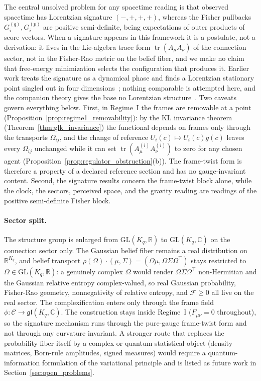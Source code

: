 \documentclass[11pt]{article}
\begin{document}
The central unsolved problem for any spacetime reading is that observed spacetime has Lorentzian signature $(-,+,+,+)$, whereas the Fisher pullbacks $G_i^{(q)}, G_i^{(p)}$ are positive semi-definite, being expectations of outer products of score vectors. When a signature appears in this framework it is a postulate, not a derivation: it lives in the Lie-algebra trace form $\operatorname{tr}(A_\mu A_\nu)$ of the connection sector, not in the Fisher-Rao metric on the belief fiber, and we make no claim that free-energy minimization selects the configuration that produces it. Earlier work treats the signature as a dynamical phase and finds a Lorentzian stationary point singled out in four dimensions~\cite{Greensite1993}; nothing comparable is attempted here, and the companion theory gives the base no Lorentzian structure~\cite[Ch.~1]{DennisGaugeVFE2026}. Two caveats govern everything below. First, in Regime~I the frames are removable at a point (Proposition~\ref{prop:regime1_removability}): by the KL invariance theorem (Theorem~\ref{thm:glk_invariance}) the functional depends on frames only through the transports $\Omega_{ij}$, and the change of reference $U_i(c) \mapsto U_i(c)g(c)$ leaves every $\Omega_{ij}$ unchanged while it can set $\operatorname{tr}(A^{(i)}_\mu A^{(i)}_\nu)$ to zero for any chosen agent (Proposition~\ref{prop:regulator_obstruction}(b)). The frame-twist form is therefore a property of a declared reference section and has no gauge-invariant content. Second, the signature results concern the frame-twist block alone, while the clock, the sectors, perceived space, and the gravity reading are readings of the positive semi-definite Fisher block.

\paragraph{Sector split.} The structure group is enlarged from $\mathrm{GL}(K_q,\mathbb{R})$ to $\mathrm{GL}(K_q,\mathbb{C})$ on the connection sector only. The Gaussian belief fiber remains a real distribution on $\mathbb{R}^{K_q}$, and belief transport $\rho(\Omega)\cdot(\mu,\Sigma) = (\Omega\mu, \Omega\Sigma\Omega^\top)$ stays restricted to $\Omega \in \mathrm{GL}(K_q,\mathbb{R})$: a genuinely complex $\Omega$ would render $\Omega\Sigma\Omega^\top$ non-Hermitian and the Gaussian relative entropy complex-valued, so real Gaussian probability, Fisher-Rao geometry, nonnegativity of relative entropy, and $\mathcal{F} \ge 0$ all live on the real sector. The complexification enters only through the frame field $\phi: \mathcal{C} \to \mathfrak{gl}(K_q,\mathbb{C})$. The construction stays inside Regime~I ($F_{\mu\nu} = 0$ throughout), so the signature mechanism runs through the pure-gauge frame-twist form and not through any curvature invariant. A stronger route that replaces the probability fiber itself by a complex or quantum statistical object (density matrices, Born-rule amplitudes, signed measures) would require a quantum-information formulation of the variational principle and is listed as future work in Section~\ref{sec:open_problems}.
\end{document}
